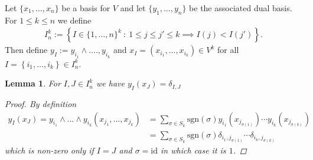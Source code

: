 \documentclass[10pt,twoside,openany,final]{memoir}
\def\sgn{\mathrm{sgn}}
\theoremstyle{break}
\newtheorem{lemma}[section]{Lemma}
\theoremstyle{Break}
\begin{document}
Let $\{x_1,\dots,x_n\}$ be a basis for $V$ and let $\{y_1,\dots,y_n\}$ be the associated dual basis. For $1 \leq k \leq n$ we define
\begin{align*}
	I_n^k:=\left\{ I \in \{1,\dots,n\}^k\ : \ 1 \leq j \leq j' \leq k \implies I(j)<I(j') \right\}.
\end{align*}
Then define $y_I:=y_{i_1} \land \dots., y_{i_k}$  and $x_I=(x_{i_1},\dots,x_{i_k})\in V^k$ for all $I=\left\{ i_1,\dots,i_k \right\} \in I_{n}^k$. 
\begin{lemma}
	For $I,J \in I_{n}^k$ we have $y_I(x_J)=\delta_{I,J}$
	\begin{proof}
		By definition
		\begin{align*}
			y_I(x_J)=y_{i_1} \land \dots \land y_{i_k}(x_{j_1},\dots,x_{j_k})&=\sum_{\sigma \in S_k} \sgn(\sigma) y_{i_1}\left(x_{j_{\sigma(1)}}\right) \cdots y_{i_k}\left(x_{j_{\sigma(k)}}\right) \\ 
			&= \sum_{\sigma \in S_k}\sgn(\sigma) \delta_{i_1, j_{\sigma(1)}} \cdots \delta_{i_k,j_{\sigma(k)}}
		\end{align*}
		which is non-zero only if $I=J$ and $\sigma=\textrm{id}$ in which case it is $1$. 
	\end{proof}
\end{lemma}
\end{document}
